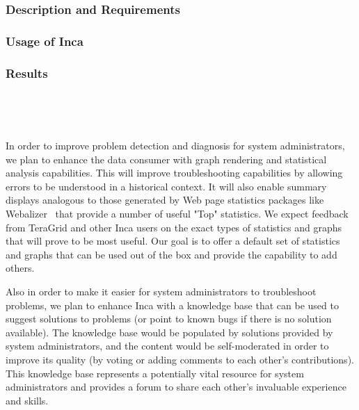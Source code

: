 \documentclass[times,10pt,twocolumn]{article}
\begin{document}
\label{grasp}

\subsubsection{Description and Requirements}


\subsubsection{Usage of Inca}


\subsubsection{Results}


~\newpage

~\newpage

In order to improve problem detection and diagnosis for system administrators,
we plan to enhance the data consumer with graph rendering and statistical
analysis capabilities.  This will improve troubleshooting capabilities by
allowing errors to be understood in a historical context.  It will also enable
summary displays analogous to those generated by Web page statistics packages
like Webalizer~\cite{webalizer} that provide a number of useful "Top"
statistics.  We expect feedback from TeraGrid and other Inca users on the
exact types of statistics and graphs that will prove to be most useful.  Our
goal is to offer a default set of statistics and graphs that can be used out
of the box and provide the capability to add others.

Also in order to make it easier for system administrators to troubleshoot
problems, we plan to enhance Inca with a knowledge base that can be used to
suggest solutions to problems (or point to known bugs if there is no solution
available).  The knowledge base would be populated by solutions provided by
system administrators, and the content would be self-moderated in order to
improve its quality (by voting or adding comments to each other's
contributions).  This knowledge base represents a potentially vital resource
for system administrators and provides a forum to share each other's
invaluable experience and skills.   
\end{document}
